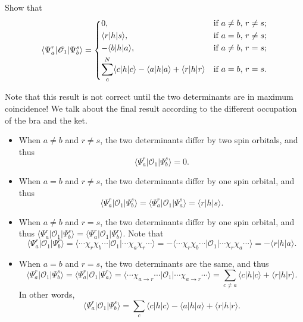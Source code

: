 \documentclass[a4paper]{book}
\newcounter{exercise}[chapter]
\newcounter{solution}[chapter]
\begin{document}
	\begin{exercise}
	Show that
	\[ \langle \Psi^r_a| \mathscr{O}_1 | \Psi^s_b \rangle =
	\begin{dcases}
		0, & \text{if } a \neq b , \, r \neq s ; \\ 
		\langle r | h | s \rangle, & \text{if } a = b , \, r \neq s ; \\ 
		-\langle b | h | a \rangle, & \text{if } a \neq b , \, r = s ; \\
		\sum_c^N \langle c | h | c \rangle - \langle a | h | a \rangle + \langle r | h | r \rangle & \text{if } a = b , \, r = s. 
	\end{dcases}
	\]	
	\end{exercise}
	
	\begin{solution}
	
	Note that this result is not correct until the two determinants are in maximum coincidence! We talk about the final result according to the different occupation of the bra and the ket.
	\begin{itemize}
	
	\item When $a \neq b$ and $r \neq s$, the two determinants differ by two spin orbitals, and thus
	\[
		\langle \Psi^r_a| \mathscr{O}_1 | \Psi^s_b \rangle = 0.
	\]
	
	\item When $a = b$ and $r \neq s$, the two determinants differ by one spin orbital, and thus 
	\[
		\langle \Psi^r_a| \mathscr{O}_1 | \Psi^s_b \rangle = \langle \Psi^r_a | \mathscr{O}_1 | \Psi^s_a \rangle = \langle r | h | s \rangle.
	\]
	
	\item When $a \neq b$ and $r = s$, the two determinants differ by one spin orbital, and thus $\langle \Psi^r_a | \mathscr{O}_1 | \Psi^s_b \rangle = \langle \Psi^r_a | \mathscr{O}_1 | \Psi^r_b \rangle$. Note that
	\[
		\langle \Psi^r_a | \mathscr{O}_1 | \Psi^r_b \rangle = \langle \cdots \chi_r \chi_b \cdots | \mathscr{O}_1 | \cdots \chi_a \chi_r \cdots \rangle = -\langle \cdots \chi_r \chi_b \cdots | \mathscr{O}_1 | \cdots \chi_r\chi_a  \cdots \rangle = -\langle r | h | a \rangle.
	\]

	\item When $a = b$ and $r = s$, the two determinants are the same, and thus
	\[
		\langle \Psi^r_a | \mathscr{O}_1 | \Psi^s_b \rangle = \langle \Psi^r_a | \mathscr{O}_1 | \Psi^r_a \rangle = \langle \cdots \chi_{a \rightarrow r} \cdots | \mathscr{O}_1 | \cdots \chi_{a \rightarrow r}  \cdots \rangle = \sum_{c\neq a} \langle c | h | c \rangle + \langle r | h | r \rangle .
	\]
	In other words,
	\[
		\langle \Psi^r_a | \mathscr{O}_1 | \Psi^s_b \rangle = \sum_{c} \langle c | h | c \rangle - \langle a | h | a \rangle + \langle r | h | r \rangle.
	\]


\end{itemize}
\end{solution}
\end{document}
